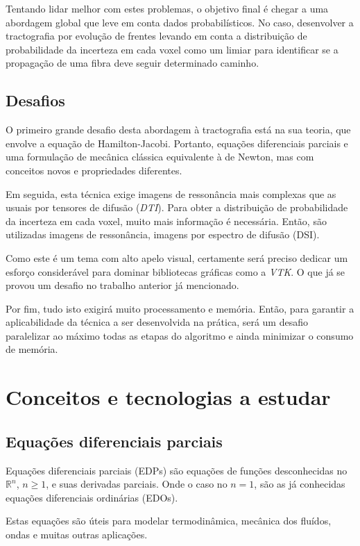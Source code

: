 \documentclass[a4paper,11pt]{report}
\begin{document}
  Tentando lidar melhor com estes problemas, o objetivo final é chegar a uma abordagem global que leve em conta dados probabilísticos. No caso, desenvolver a tractografia por evolução de frentes levando em conta a distribuição de probabilidade da incerteza em cada voxel como um limiar para identificar se a propagação de uma fibra deve seguir determinado caminho.
  
  \section{Desafios}
  O primeiro grande desafio desta abordagem à tractografia está na sua teoria, que envolve a equação de Hamilton-Jacobi. Portanto, equações diferenciais parciais e uma formulação de mecânica clássica equivalente à de Newton, mas com conceitos novos e propriedades diferentes.
  
  Em seguida, esta técnica exige imagens de ressonância mais complexas que as usuais por tensores de difusão (\textit{DTI}). Para obter a distribuição de probabilidade da incerteza em cada voxel, muito mais informação é necessária. Então, são utilizadas imagens de ressonância, imagens por espectro de difusão (DSI).
  
  Como este é um tema com alto apelo visual, certamente será preciso dedicar um esforço considerável para dominar bibliotecas gráficas como a \textit{VTK}. O que já se provou um desafio no trabalho anterior já mencionado.
  
  Por fim, tudo isto exigirá muito processamento e memória. Então, para garantir a aplicabilidade da técnica a ser desenvolvida na prática, será um desafio paralelizar ao máximo todas as etapas do algoritmo e ainda minimizar o consumo de memória.
  
\chapter{Conceitos e tecnologias a estudar}
  \section{Equações diferenciais parciais}
    Equações diferenciais parciais (EDPs) são equações de funções desconhecidas no $\mathbb{R}^{n}$, $n \geq 1$, e suas derivadas parciais. Onde o caso no $n = 1$, são as já conhecidas equações diferenciais ordinárias (EDOs).
    
    Estas equações são úteis para modelar termodinâmica, mecânica dos fluídos, ondas e muitas outras aplicações.
  
\end{document}
